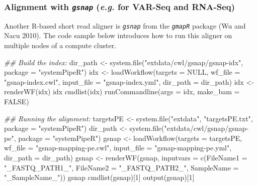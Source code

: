 \documentclass[14pt,]{article}
\newcommand{\hlnum}[1]{\textcolor[rgb]{0.816,0.125,0.439}{#1}}%
\newcommand{\hlstr}[1]{\textcolor[rgb]{0.251,0.627,0.251}{#1}}%
\newcommand{\hlcom}[1]{\textcolor[rgb]{0.502,0.502,0.502}{\textit{#1}}}%
\newcommand{\hlstd}[1]{\textcolor[rgb]{0.251,0.251,0.251}{#1}}%
\newcommand{\hlkwc}[1]{\textcolor[rgb]{0.251,0.251,0.251}{#1}}%
\newcommand{\hlkwd}[1]{\textcolor[rgb]{0.878,0.439,0.125}{#1}}%
\newenvironment{Shaded}{\begin{myshaded}}{\end{myshaded}}
\newcommand{\KeywordTok}[1]{\hlkwd{#1}}
\newcommand{\DataTypeTok}[1]{\hlkwc{#1}}
\newcommand{\DecValTok}[1]{\hlnum{#1}}
\newcommand{\StringTok}[1]{\hlstr{#1}}
\newcommand{\CommentTok}[1]{\hlcom{#1}}
\newcommand{\OtherTok}[1]{{#1}}
\newcommand{\NormalTok}[1]{\hlstd{#1}}
\begin{document}
\hypertarget{alignment-with-gsnap-e.g.-for-var-seq-and-rna-seq}{%
\subsubsection{\texorpdfstring{Alignment with \emph{\texttt{gsnap}} (\emph{e.g.} for VAR-Seq and RNA-Seq)}{Alignment with gsnap (e.g. for VAR-Seq and RNA-Seq)}}\label{alignment-with-gsnap-e.g.-for-var-seq-and-rna-seq}}

Another R-based short read aligner is \emph{\texttt{gsnap}} from the \emph{\texttt{gmapR}} package (Wu and Nacu 2010).
The code sample below introduces how to run this aligner on multiple nodes of a compute cluster.

\begin{Shaded}
\begin{Highlighting}[]
\CommentTok{## Build the index:}
\NormalTok{dir_path <-}\StringTok{ }\KeywordTok{system.file}\NormalTok{(}\StringTok{"extdata/cwl/gsnap/gsnap-idx"}\NormalTok{, }\DataTypeTok{package =} \StringTok{"systemPipeR"}\NormalTok{)}
\NormalTok{idx <-}\StringTok{ }\KeywordTok{loadWorkflow}\NormalTok{(}\DataTypeTok{targets =} \OtherTok{NULL}\NormalTok{, }\DataTypeTok{wf_file =} \StringTok{"gsnap-index.cwl"}\NormalTok{, }\DataTypeTok{input_file =} \StringTok{"gsnap-index.yml"}\NormalTok{, }
    \DataTypeTok{dir_path =}\NormalTok{ dir_path)}
\NormalTok{idx <-}\StringTok{ }\KeywordTok{renderWF}\NormalTok{(idx)}
\NormalTok{idx}
\KeywordTok{cmdlist}\NormalTok{(idx)}
\KeywordTok{runCommandline}\NormalTok{(}\DataTypeTok{args =}\NormalTok{ idx, }\DataTypeTok{make_bam =} \OtherTok{FALSE}\NormalTok{)}

\CommentTok{## Running the alignment:}
\NormalTok{targetsPE <-}\StringTok{ }\KeywordTok{system.file}\NormalTok{(}\StringTok{"extdata"}\NormalTok{, }\StringTok{"targetsPE.txt"}\NormalTok{, }\DataTypeTok{package =} \StringTok{"systemPipeR"}\NormalTok{)}
\NormalTok{dir_path <-}\StringTok{ }\KeywordTok{system.file}\NormalTok{(}\StringTok{"extdata/cwl/gsnap/gsnap-pe"}\NormalTok{, }\DataTypeTok{package =} \StringTok{"systemPipeR"}\NormalTok{)}
\NormalTok{gsnap <-}\StringTok{ }\KeywordTok{loadWorkflow}\NormalTok{(}\DataTypeTok{targets =}\NormalTok{ targetsPE, }\DataTypeTok{wf_file =} \StringTok{"gsnap-mapping-pe.cwl"}\NormalTok{, }\DataTypeTok{input_file =} \StringTok{"gsnap-mapping-pe.yml"}\NormalTok{, }
    \DataTypeTok{dir_path =}\NormalTok{ dir_path)}
\NormalTok{gsnap <-}\StringTok{ }\KeywordTok{renderWF}\NormalTok{(gsnap, }\DataTypeTok{inputvars =} \KeywordTok{c}\NormalTok{(}\DataTypeTok{FileName1 =} \StringTok{"_FASTQ_PATH1_"}\NormalTok{, }\DataTypeTok{FileName2 =} \StringTok{"_FASTQ_PATH2_"}\NormalTok{, }
    \DataTypeTok{SampleName =} \StringTok{"_SampleName_"}\NormalTok{))}
\NormalTok{gsnap}
\KeywordTok{cmdlist}\NormalTok{(gsnap)[}\DecValTok{1}\NormalTok{]}
\KeywordTok{output}\NormalTok{(gsnap)[}\DecValTok{1}\NormalTok{]}


\end{Highlighting}
\end{Shaded}
\end{document}
